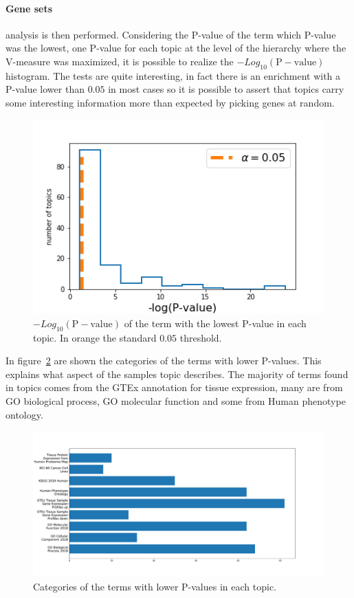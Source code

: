 \paragraph{Gene sets} analysis is then performed. Considering the P-value of the term which P-value was the lowest, one P-value for each topic at the level of the hierarchy where the V-measure was maximized, it is possible to realize the $-Log_{10}(\mathrm{P-value})$ histogram. The tests are quite interesting, in fact there is an enrichment with a P-value lower than $0.05$ in most cases so it is possible to assert that topics carry some interesting information more than expected by picking genes at random.
\begin{figure}[htb!]
    \centering
    \includegraphics[width=0.5\linewidth]{pictures/topic/merged/pvaluescrosstopic.png}
    \caption{$-Log_{10}(\mathrm{P-value})$ of the term with the lowest P-value in each topic. In orange the standard $0.05$ threshold.}
    \label{fig:topic/merged/pvaluescrosstopic}
\end{figure}
In figure~\ref{fig:topic/merged/pvaluecategories} are shown the categories of the terms with lower P-values. This explains what aspect of the samples topic describes. The majority of terms found in topics comes from the GTEx annotation for tissue expression, many are from GO biological process, GO molecular function and some from Human phenotype ontology. 
\begin{figure}[htb!]
    \centering
    \includegraphics[width=0.8\linewidth]{pictures/topic/merged/pvaluecategories.pdf}
    \caption{Categories of the terms with lower P-values in each topic.}
    \label{fig:topic/merged/pvaluecategories}
\end{figure}

